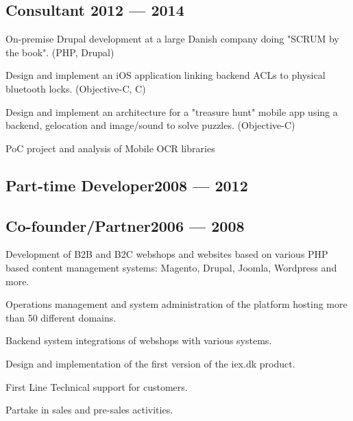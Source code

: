 \subsection{{Consultant \hfill 2012 --- 2014}}

\begin{zitemize}
	\item On-premise Drupal development at a large Danish company doing "SCRUM by the book". (PHP, Drupal)
	\item Design and implement an iOS application linking backend ACLs to physical bluetooth locks. (Objective-C, C)
	\item Design and implement an architecture for a "treasure hunt" mobile app using a backend, gelocation and image/sound to solve
puzzles. (Objective-C)
	\item PoC project and analysis of Mobile OCR libraries
\end{zitemize}

\subsection{{Part-time Developer\hfill 2008 --- 2012}}
\subsection{{Co-founder/Partner\hfill 2006 --- 2008}}

\begin{zitemize}
	\item Development of B2B and B2C webshops and websites based on various PHP based content management systems: Magento, Drupal, Joomla, Wordpress and more.
	\item Operations management and system administration of the platform hosting more than 50 different domains.
	\item Backend system integrations of webshops with various systems.
	\item Design and implementation of the first version of the iex.dk product.
	\item First Line Technical support for customers.
	\item Partake in sales and pre-sales activities.
\end{zitemize}


